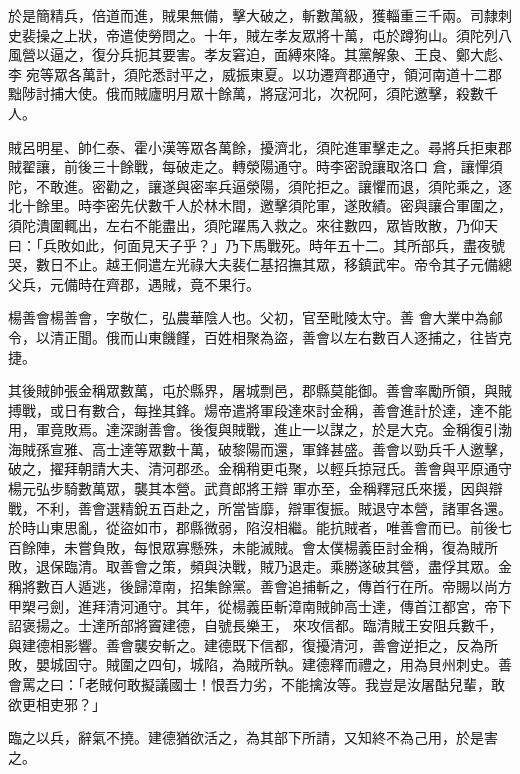 \begin{pinyinscope}
 於是簡精兵，倍道而進，賊果無備，擊大破之，斬數萬級，獲輜重三千兩。司隸刺史裴操之上狀，帝遣使勞問之。十年，賊左孝友眾將十萬，屯於蹲狗山。須陀列八風營以逼之，復分兵扼其要害。孝友窘迫，面縛來降。其黨解象、王良、鄭大彪、李宛等眾各萬計，須陀悉討平之，威振東夏。以功遷齊郡通守，領河南道十二郡黜陟討捕大使。俄而賊廬明月眾十餘萬，將寇河北，次祝阿，須陀邀擊，殺數千人。



 賊呂明星、帥仁泰、霍小漢等眾各萬餘，擾濟北，須陀進軍擊走之。尋將兵拒東郡賊翟讓，前後三十餘戰，每破走之。轉滎陽通守。時李密說讓取洛口
 倉，讓憚須陀，不敢進。密勸之，讓遂與密率兵逼滎陽，須陀拒之。讓懼而退，須陀乘之，逐北十餘里。時李密先伏數千人於林木間，邀擊須陀軍，遂敗績。密與讓合軍圍之，須陀潰圍輒出，左右不能盡出，須陀躍馬入救之。來往數四，眾皆敗散，乃仰天曰：「兵敗如此，何面見天子乎？」乃下馬戰死。時年五十二。其所部兵，盡夜號哭，數日不止。越王侗遣左光祿大夫裴仁基招撫其眾，移鎮武牢。帝令其子元備總父兵，元備時在齊郡，遇賊，竟不果行。



 楊善會楊善會，字敬仁，弘農華陰人也。父初，官至毗陵太守。善
 會大業中為鄃令，以清正聞。俄而山東饑饉，百姓相聚為盜，善會以左右數百人逐捕之，往皆克捷。



 其後賊帥張金稱眾數萬，屯於縣界，屠城剽邑，郡縣莫能御。善會率勵所領，與賊搏戰，或日有數合，每挫其鋒。煬帝遣將軍段達來討金稱，善會進計於達，達不能用，軍竟敗焉。達深謝善會。後復與賊戰，進止一以謀之，於是大克。金稱復引渤海賊孫宣雅、高士達等眾數十萬，破黎陽而還，軍鋒甚盛。善會以勁兵千人邀擊，破之，擢拜朝請大夫、清河郡丞。金稱稍更屯聚，以輕兵掠冠氏。善會與平原通守楊元弘步騎數萬眾，襲其本營。武賁郎將王辯
 軍亦至，金稱釋冠氏來援，因與辯戰，不利，善會選精銳五百赴之，所當皆靡，辯軍復振。賊退守本營，諸軍各還。於時山東思亂，從盜如市，郡縣微弱，陷沒相繼。能抗賊者，唯善會而已。前後七百餘陣，未嘗負敗，每恨眾寡懸殊，未能滅賊。會太僕楊義臣討金稱，復為賊所敗，退保臨清。取善會之策，頻與決戰，賊乃退走。乘勝遂破其營，盡俘其眾。金稱將數百人遁逃，後歸漳南，招集餘黨。善會追捕斬之，傳首行在所。帝賜以尚方甲槊弓劍，進拜清河通守。其年，從楊義臣斬漳南賊帥高士達，傳首江都宮，帝下詔褒揚之。士達所部將竇建德，自號長樂王，
 來攻信都。臨清賊王安阻兵數千，與建德相影響。善會襲安斬之。建德既下信都，復擾清河，善會逆拒之，反為所敗，嬰城固守。賊圍之四旬，城陷，為賊所執。建德釋而禮之，用為貝州刺史。善會罵之曰：「老賊何敢擬議國士！恨吾力劣，不能擒汝等。我豈是汝屠酤兒輩，敢欲更相吏邪？」



 臨之以兵，辭氣不撓。建德猶欲活之，為其部下所請，又知終不為己用，於是害之。




\end{pinyinscope}
